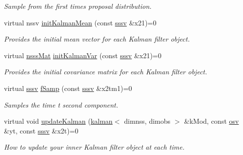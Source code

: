 \begin{DoxyCompactItemize}
\begin{DoxyCompactList}\small\item\em Sample from the first time\textquotesingle{}s proposal distribution. \end{DoxyCompactList}\item 
virtual nssv \hyperlink{classrbpf__kalman__bs_a566420e8b13c912d06c898b79023ab94}{init\+Kalman\+Mean} (const \hyperlink{classrbpf__kalman__bs_a803b67ae284377c11e727bb47601045a}{sssv} \&x21)=0
\begin{DoxyCompactList}\small\item\em Provides the initial mean vector for each Kalman filter object. \end{DoxyCompactList}\item 
virtual \hyperlink{classrbpf__kalman__bs_ad20086b480fa12e9179a573c4b47818f}{nsss\+Mat} \hyperlink{classrbpf__kalman__bs_af89c8909360ea2bd2eccdb02e65b1cf4}{init\+Kalman\+Var} (const \hyperlink{classrbpf__kalman__bs_a803b67ae284377c11e727bb47601045a}{sssv} \&x21)=0
\begin{DoxyCompactList}\small\item\em Provides the initial covariance matrix for each Kalman filter object. \end{DoxyCompactList}\item 
virtual \hyperlink{classrbpf__kalman__bs_a803b67ae284377c11e727bb47601045a}{sssv} \hyperlink{classrbpf__kalman__bs_af55528bb974502bc88ba2a72b479d675}{f\+Samp} (const \hyperlink{classrbpf__kalman__bs_a803b67ae284377c11e727bb47601045a}{sssv} \&x2tm1)=0
\begin{DoxyCompactList}\small\item\em Samples the time t second component. \end{DoxyCompactList}\item 
virtual void \hyperlink{classrbpf__kalman__bs_a43b6528f464bad8366027667f0301024}{update\+Kalman} (\hyperlink{classkalman}{kalman}$<$ dimnss, dimobs $>$ \&k\+Mod, const \hyperlink{classrbpf__kalman__bs_a87690d6ffb54ffb4b76dc2de7fd415d5}{osv} \&yt, const \hyperlink{classrbpf__kalman__bs_a803b67ae284377c11e727bb47601045a}{sssv} \&x2t)=0
\begin{DoxyCompactList}\small\item\em How to update your inner Kalman filter object at each time. \end{DoxyCompactList}\end{DoxyCompactItemize}
